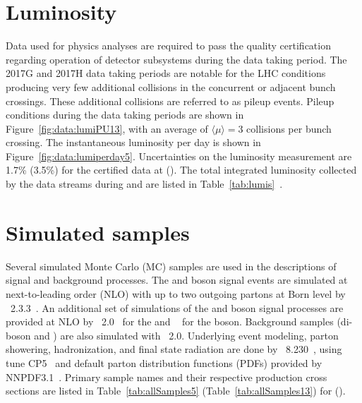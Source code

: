 \section{Luminosity}\label{ch:lumi}
Data used for physics analyses are required to pass the quality certification regarding operation of detector subsystems during the data taking period. 
%
The 2017G and 2017H data taking periods are notable for the LHC conditions producing very few additional collisions in the concurrent or adjacent bunch crossings. These additional collisions are referred to as pileup events. Pileup conditions during the data taking periods are shown in Figure~\ref{fig:data:lumiPU13}, with an average of $\langle\mu\rangle=3$ collisions per bunch crossing. The instantaneous luminosity per day is shown in Figure~\ref{fig:data:lumiperday5}. Uncertainties on the luminosity measurement are 1.7\% (3.5\%) for the certified data at \serah (\serag). The total integrated luminosity collected by the data streams during \serag and \serah are listed in Table~\ref{tab:lumis}~\cite{LumiPOGNumbers}.







\section{Simulated samples}\label{ch:data:sim}
Several simulated Monte Carlo (MC) samples are used in the descriptions of signal and background processes. The \Wpm and \Z boson signal events are simulated at next-to-leading order (NLO) with up to two outgoing partons at Born level by \MGvATNLO~2.3.3~\cite{Alwall:2014hca}. An additional set of simulations of the \Wpm and \Z boson signal processes are provided at NLO by \POWHEG~2.0~\cite{Alioli:2008gx,Frixione:2007vw,powheg:2010,Alioli:2010xd} for the \Wpm and \MINLO~\cite{Hamilton:2012rf} for the \Z boson. Background samples (di-boson and \ttbar) are also simulated with \POWHEG~2.0. Underlying event modeling, parton showering, hadronization, and final state radiation are done by \PYTHIA~8.230~\cite{Sjostrand:2014zea}, using tune CP5~\cite{Sirunyan:2019dfx} and default parton distribution functions (PDFs) provided by NNPDF3.1~\cite{Ball:2017nwa}. Primary sample names and their respective production cross sections are listed in Table~\ref{tab:allSamples5} (Table~\ref{tab:allSamples13}) for \serag (\serah).

